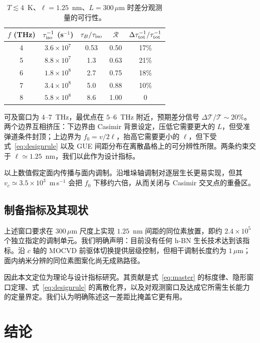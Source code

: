 \documentclass[10pt,twocolumn]{article}
\newcommand{\Tr}{\mathcal{T}}
\begin{document}
\begin{table}[h]
\centering\small
\caption{$T\lesssim4$~K、$\ell=1.25$~nm、$L=300\,\mu$m 时差分观测量的可行性。}
\label{tab:window}
\begin{tabular}{ccccc}
\hline\hline
$f$ (THz) & $\tau_{\rm iso}^{-1}$ (s$^{-1}$) & $\tau_B/\tau_{\rm iso}$ &
$\mathcal{R}$ & $\Delta\tau_{\rm tot}^{-1}/\tau_{\rm tot}^{-1}$ \\
\hline
4 & $3.6\times10^{7}$ & 0.53 & 0.50 & 17\% \\
5 & $8.8\times10^{7}$ & 1.3  & 0.63 & 21\% \\
6 & $1.8\times10^{8}$ & 2.7  & 0.75 & 18\% \\
7 & $3.4\times10^{8}$ & 5.0  & 0.88 & 10\% \\
8 & $5.8\times10^{8}$ & 8.6  & 1.00 & 0    \\
\hline\hline
\end{tabular}
\end{table}

可及窗口为 $4$--$7$~THz，最优点在 $5$--$6$~THz 附近，预期差分信号 $\Delta\Tr/\Tr\sim20\%$。两个边界互相挤压：下边界由 Casimir 背景设定，压低它需要更大的 $L$，但受准弹道条件封顶；上边界为 $f_0=v/2\ell$，抬高它需要更小的 $\ell$，但下受式~\eqref{eq:designrule} 以及 GUE 间距分布在离散晶格上的可分辨性所限。两条约束交于 $\ell\simeq1.25$~nm，我们以此作为设计指标。

以上数值假定面内传播与面内调制。沿堆垛轴调制对逐层生长更易实现，但其 $v_c\simeq3.5\times10^{3}$~m\,s$^{-1}$ 会把 $f_0$ 下移约六倍，从而关闭与 Casimir 交叉点的重叠区。

\subsection{制备指标及其现状}

上述窗口要求在 $300\,\mu$m 尺度上实现 $1.25$~nm 间距的同位素放置，即约 $2.4\times10^{5}$ 个独立指定的调制单元。我们明确声明：目前没有任何 h-BN 生长技术达到该指标。沿 $c$ 轴的 MOCVD 前驱体切换提供层级控制，但相干调制长度约为 $1\,\mu$m；面内纳米分辨的同位素图案化尚无成熟路径。

因此本文定位为理论与设计指标研究。其贡献是式~\eqref{eq:master} 的标度律、隐形窗口定理、式~\eqref{eq:designrule} 的离散化界，以及对观测窗口及达成它所需生长能力的定量界定。我们认为明确陈述这一差距比掩盖它更有用。

\section{结论}
\end{document}
